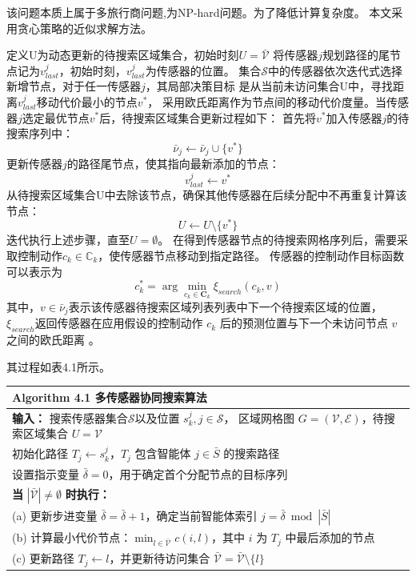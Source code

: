 该问题本质上属于多旅行商问题,为NP-hard问题。为了降低计算复杂度。
本文采用贪心策略的近似求解方法。

定义$\mathrm{U}$为动态更新的待搜索区域集合，初始时刻$U=\bar{\mathcal{V}}$
将传感器$j$规划路径的尾节点记为$v_{last}^j$，初始时刻，$v_{last}^j$为传感器的位置。
集合$\mathcal{S}$中的传感器依次迭代式选择新增节点，对于任一传感器$j$，其局部决策目标
是从当前未访问集合$\mathrm{U}$中，寻找距离$v_{last}^j$移动代价最小的节点$v^{*}$，
采用欧氏距离作为节点间的移动代价度量。当传感器$j$选定最优节点$v^{*}$后，待搜索区域集合更新过程如下：
首先将$v^{*}$加入传感器$j$的待搜索序列中：
\begin{equation}
\bar{\nu}_j\leftarrow\bar{\nu}_j\cup\{v^*\}
\end{equation} 
更新传感器$j$的路径尾节点，使其指向最新添加的节点：
\begin{equation}
v_{last}^j\leftarrow v^*
\end{equation} 
从待搜索区域集合$\mathrm{U}$中去除该节点，确保其他传感器在后续分配中不再重复计算该节点：
\begin{equation}
U\leftarrow U\setminus\{v^*\}
\end{equation} 
迭代执行上述步骤，直至$U=\emptyset$。
在得到传感器节点的待搜索网格序列后，需要采取控制动作$c_k\in\mathbb{C}_k$，使传感器节点移动到指定路径。
传感器的控制动作目标函数可以表示为
\begin{equation}
c_k^*=\arg\min_{c_k\in\mathbf{C}_k}\xi_{search}(c_k,v)
\end{equation} 
其中，$v\in\bar{\nu}_j$表示该传感器待搜索区域列表列表中下一个待搜索区域的位置，
$\xi_{search}$返回传感器在应用假设的控制动作 $c_k$ 后的预测位置与下一个未访问节点 $v$ 之间的欧氏距离 。

其过程如表4.1所示。

\begin{table}[htbp]
  \centering
  \label{alg:mappo_coop}
  \renewcommand{\arraystretch}{1.2} %
  \begin{tabular}{p{}}
    \toprule
    \textbf{Algorithm 4.1} 多传感器协同搜索算法 \\
    \midrule
    \textbf{输入：} 搜索传感器集合$\mathcal{S}$以及位置 $s_k^j, j \in \mathcal{S}$，
    区域网格图 $G = (\mathcal{V}, \mathcal{E})$，待搜索区域集合 $U = \mathcal{V}$ \\
    初始化路径 $T_j \leftarrow s_k^j$，$T_j$ 包含智能体 $j \in \bar{S}$ 的搜索路径 \\
    设置指示变量 $\bar{\delta} = 0$，用于确定首个分配节点的目标序列 \\
    \textbf{当} $|\bar{\mathcal{V}}| \neq \emptyset$ \textbf{时执行：} \\
    \quad (a) 更新步进变量 $\bar{\delta} = \bar{\delta} + 1$，确定当前智能体索引 $j = \bar{\delta} \bmod |\bar{S}|$ \\
    \quad (b) 计算最小代价节点：$\min_{l \in \bar{\mathcal{V}}} c(i, l)$，其中 $i$ 为 $T_j$ 中最后添加的节点 \\
    \quad (c) 更新路径 $T_j \leftarrow l$，并更新待访问集合 $\bar{\mathcal{V}} = \bar{\mathcal{V}} \setminus \{l\}$ \\
    \bottomrule
  \end{tabular}
\end{table}

